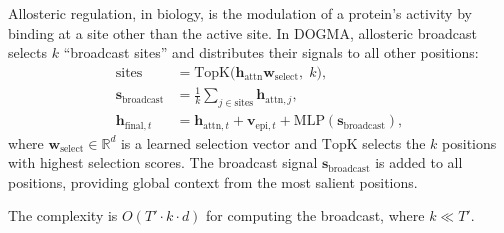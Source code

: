 Allosteric regulation, in biology, is the modulation of a protein's activity by binding at a site other than the active site. In DOGMA, allosteric broadcast selects $k$ ``broadcast sites'' and distributes their signals to all other positions:
\begin{align}
\text{sites} &= \mathrm{TopK}\bigl(\mathbf{h}_{\text{attn}} \mathbf{w}_{\text{select}},\; k\bigr), \label{eq:allo-select} \\
\mathbf{s}_{\text{broadcast}} &= \frac{1}{k}\sum_{j \in \text{sites}} \mathbf{h}_{\text{attn}, j}, \label{eq:allo-mean} \\
\mathbf{h}_{\text{final}, t} &= \mathbf{h}_{\text{attn}, t} + \mathbf{v}_{\text{epi}, t} + \mathrm{MLP}(\mathbf{s}_{\text{broadcast}}), \label{eq:allo-combine}
\end{align}
where $\mathbf{w}_{\text{select}} \in \mathbb{R}^d$ is a learned selection vector and $\mathrm{TopK}$ selects the $k$ positions with highest selection scores. The broadcast signal $\mathbf{s}_{\text{broadcast}}$ is added to all positions, providing global context from the most salient positions.

The complexity is $O(T' \cdot k \cdot d)$ for computing the broadcast, where $k \ll T'$.

